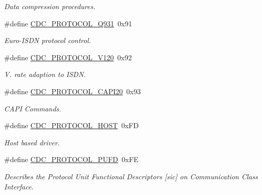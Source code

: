 \begin{DoxyCompactItemize}
\begin{DoxyCompactList}\small\item\em \-Data compression procedures. \end{DoxyCompactList}\item 
\#define \hyperlink{group__cdc__protocol__group_ga0083ef9581e965b89b52d55bf315e419}{\-C\-D\-C\-\_\-\-P\-R\-O\-T\-O\-C\-O\-L\-\_\-\-Q931}~0x91
\begin{DoxyCompactList}\small\item\em \-Euro-\/\-I\-S\-D\-N protocol control. \end{DoxyCompactList}\item 
\#define \hyperlink{group__cdc__protocol__group_ga208090ddb75268f1f49e8e815400b6e3}{\-C\-D\-C\-\_\-\-P\-R\-O\-T\-O\-C\-O\-L\-\_\-\-V120}~0x92
\begin{DoxyCompactList}\small\item\em \-V. rate adaption to \-I\-S\-D\-N. \end{DoxyCompactList}\item 
\#define \hyperlink{group__cdc__protocol__group_ga4ae176ca7b4078cfc2506faff308d049}{\-C\-D\-C\-\_\-\-P\-R\-O\-T\-O\-C\-O\-L\-\_\-\-C\-A\-P\-I20}~0x93
\begin{DoxyCompactList}\small\item\em \-C\-A\-P\-I \-Commands. \end{DoxyCompactList}\item 
\#define \hyperlink{group__cdc__protocol__group_gae3fb87c639e467c9e9a1cab674a53463}{\-C\-D\-C\-\_\-\-P\-R\-O\-T\-O\-C\-O\-L\-\_\-\-H\-O\-S\-T}~0x\-F\-D
\begin{DoxyCompactList}\small\item\em \-Host based driver. \end{DoxyCompactList}\item 
\#define \hyperlink{group__cdc__protocol__group_gaa4704c0876c47f0fc9b4e1e2812a746c}{\-C\-D\-C\-\_\-\-P\-R\-O\-T\-O\-C\-O\-L\-\_\-\-P\-U\-F\-D}~0x\-F\-E
\begin{DoxyCompactList}\small\item\em \-Describes the \-Protocol \-Unit \-Functional \-Descriptors \mbox{[}sic\mbox{]} on \-Communication \-Class \-Interface. \end{DoxyCompactList}\end{DoxyCompactItemize}
